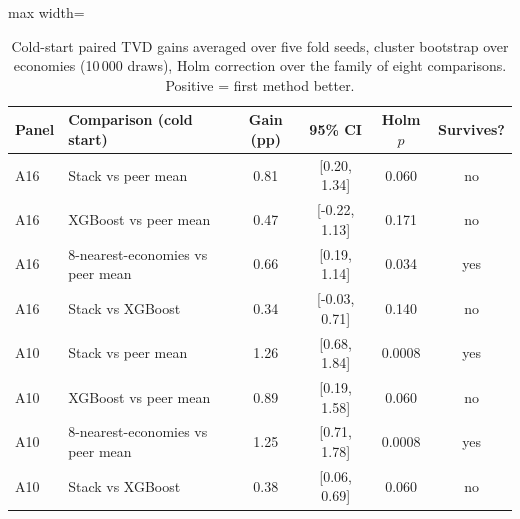 \begin{table}
\caption{Cold-start paired TVD gains averaged over five fold seeds, cluster bootstrap over economies (10\,000 draws), Holm correction over the family of eight comparisons. Positive = first method better.}\label{tab:holm}
\centering\small
\renewcommand{\arraystretch}{1.1}
\begin{adjustbox}{max width=\linewidth}
\begin{tabular}{llcccc}
\toprule
Panel & Comparison (cold start) & Gain (pp) & 95\% CI & Holm $p$ & Survives? \\
\midrule
A16 & Stack vs peer mean & 0.81 & [0.20, 1.34] & 0.060 & no \\
A16 & XGBoost vs peer mean & 0.47 & [-0.22, 1.13] & 0.171 & no \\
A16 & 8-nearest-economies vs peer mean & 0.66 & [0.19, 1.14] & 0.034 & yes \\
A16 & Stack vs XGBoost & 0.34 & [-0.03, 0.71] & 0.140 & no \\
A10 & Stack vs peer mean & 1.26 & [0.68, 1.84] & 0.0008 & yes \\
A10 & XGBoost vs peer mean & 0.89 & [0.19, 1.58] & 0.060 & no \\
A10 & 8-nearest-economies vs peer mean & 1.25 & [0.71, 1.78] & 0.0008 & yes \\
A10 & Stack vs XGBoost & 0.38 & [0.06, 0.69] & 0.060 & no \\
\bottomrule
\end{tabular}\end{adjustbox}
\end{table}
